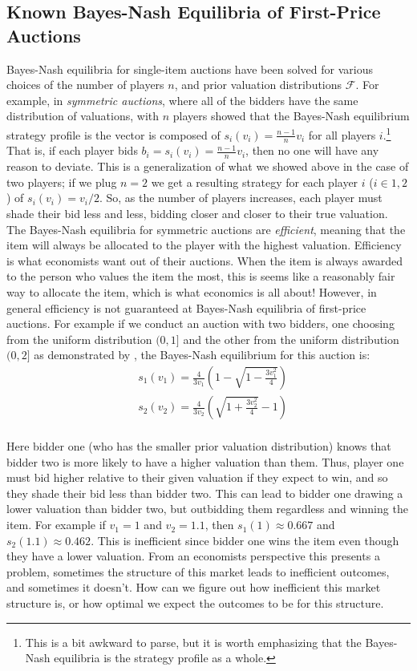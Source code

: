 \documentclass[12pt,twoside]{reedthesis}
\begin{document}
\subsection{Known Bayes-Nash Equilibria of First-Price Auctions}
Bayes-Nash equilibria for single-item auctions have been solved for various choices of the number of players $n$, and prior valuation distributions $\mathcal{F}$. For example, in {\em symmetric auctions},  where all of the bidders have the same distribution of valuations, with $n$ players \cite{Chawla2013} showed that the Bayes-Nash equilibrium strategy profile is the vector is composed of $s_i(v_i) = \frac{n-1}{n} v_i$ for all players $i$.\footnote{This is a bit awkward to parse, but it is worth emphasizing that the Bayes-Nash equilibria is the strategy profile as a whole.} That is, if each player bids $b_i = s_i(v_i) = \frac{n -1}{n} v_i$, then no one will have any reason to deviate. This is a generalization of what we showed above in the case of two players; if we plug $n=2$ we get a resulting strategy for each player $i$ ($i \in {1,2}$) of $s_i(v_i) = v_i/2$. So, as the number of players increases, each player must shade their bid less and less, bidding closer and closer to their true valuation. The Bayes-Nash equilibria for symmetric auctions are {\em efficient}, meaning that the item will always be allocated to the player with the highest valuation. Efficiency is what economists want out of their auctions. When the item is always awarded to the person who values the item the most, this is seems like a reasonably fair way to allocate the item, which is what economics is all about! However, in general efficiency is not guaranteed at Bayes-Nash equilibria of first-price auctions. For example if we conduct an auction with two bidders, one choosing from the uniform distribution $(0,1]$ and the other from the uniform distribution $(0,2]$ as demonstrated by \citet{Krishna2002}, the Bayes-Nash equilibrium for this auction is:
\begin{align*}
	&s_1(v_1) = \frac{4}{3 v_1} \left(1 - \sqrt{1 - \frac{3v_1^2}{4}}\right)\\
	&s_2(v_2) = \frac{4}{3 v_2} \left(\sqrt{1 + \frac{3v_2^2}{4}} - 1 \right)\\
\end{align*}

Here bidder one (who has the smaller prior valuation distribution) knows that bidder two is more likely to have a higher valuation than them. Thus, player one must bid higher relative to their given valuation if they expect to win, and so they shade their bid less than bidder two. This can lead to bidder one drawing a lower valuation than bidder two, but outbidding them regardless and winning the item. For example if $v_1 = 1$ and $v_2 = 1.1$, then $s_1(1) \approx 0.667$ and $s_2(1.1) \approx 0.462$. This is inefficient since bidder one wins the item even though they have a lower valuation. From an economists perspective this presents a problem, sometimes the structure of this market leads to inefficient outcomes, and sometimes it doesn't. How can we figure out how inefficient this market structure is, or how optimal we expect the outcomes to be for this structure.
\end{document}
